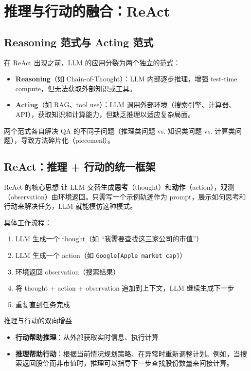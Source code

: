 \section{推理与行动的融合：ReAct}

\subsection{Reasoning 范式与 Acting 范式}

在 ReAct 出现之前，LLM 的应用分裂为两个独立的范式：

\begin{itemize}
    \item \textbf{Reasoning}（如 Chain-of-Thought）：LLM 内部逐步推理，增强 test-time compute，但无法获取外部知识或工具。
    \item \textbf{Acting}（如 RAG、tool use）：LLM 调用外部环境（搜索引擎、计算器、API），获取知识和计算能力，但缺乏推理以适应复杂局面。
\end{itemize}

两个范式各自解决 QA 的不同子问题（推理类问题 vs. 知识类问题 vs. 计算类问题），导致方法碎片化（piecemeal）。

\subsection{ReAct：推理 + 行动的统一框架}

\begin{importantbox}{ReAct 的核心思想}
让 LLM 交替生成\textbf{思考}（thought）和\textbf{动作}（action），观测（observation）由环境返回。只需写一个示例轨迹作为 prompt，展示如何思考和行动来解决任务，LLM 就能模仿这种模式。
\end{importantbox}

具体工作流程：
\begin{enumerate}
    \item LLM 生成一个 thought（如 ``我需要查找这三家公司的市值''）
    \item LLM 生成一个 action（如 \texttt{Google{[}Apple market cap{]}}）
    \item 环境返回 observation（搜索结果）
    \item 将 thought + action + observation 追加到上下文，LLM 继续生成下一步
    \item 重复直到任务完成
\end{enumerate}

\begin{knowledgebox}{推理与行动的双向增益}
\begin{itemize}
    \item \textbf{行动帮助推理}：从外部获取实时信息、执行计算
    \item \textbf{推理帮助行动}：根据当前情况规划策略、在异常时重新调整计划。例如，当搜索返回股价而非市值时，推理可以指导下一步查找股份数量来间接计算。
\end{itemize}
\end{knowledgebox}

